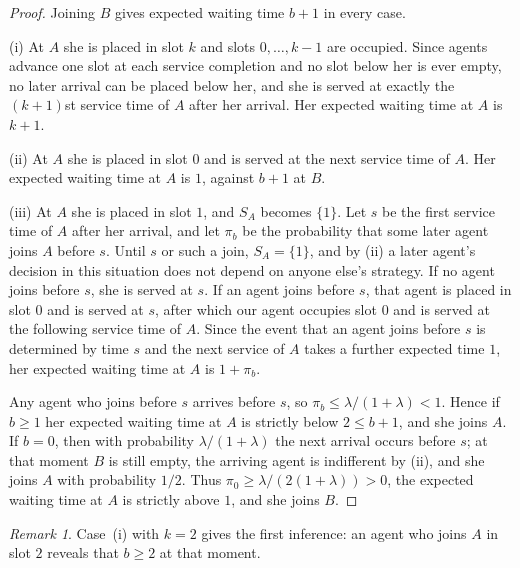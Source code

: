 \documentclass[11pt]{article}
\theoremstyle{definition}
\theoremstyle{remark}
\newtheorem{brem}[bthm]{Remark}
\begin{document}
\begin{proof}
Joining $B$ gives expected waiting time $b+1$ in every case.

(i) At $A$ she is placed in slot $k$ and slots $0,\dots,k-1$ are occupied.
Since agents advance one slot at each service completion and no slot below her
is ever empty, no later arrival can be placed below her, and she is served at
exactly the $(k+1)$st service time of $A$ after her arrival. Her expected
waiting time at $A$ is $k+1$.

(ii) At $A$ she is placed in slot $0$ and is served at the next service time of
$A$. Her expected waiting time at $A$ is $1$, against $b+1$ at $B$.

(iii) At $A$ she is placed in slot $1$, and $S_A$ becomes $\{1\}$. Let $s$ be
the first service time of $A$ after her arrival, and let $\pi_b$ be the
probability that some later agent joins $A$ before $s$. Until $s$ or such a
join, $S_A=\{1\}$, and by (ii) a later agent's decision in this situation does
not depend on anyone else's strategy. If no agent joins before $s$, she is
served at $s$. If an agent joins before $s$, that agent is placed in slot $0$
and is served at $s$, after which our agent occupies slot $0$ and is served at
the following service time of $A$. Since the event that an agent joins before
$s$ is determined by time $s$ and the next service of $A$ takes a further
expected time $1$, her expected waiting time at $A$ is $1+\pi_b$.

Any agent who joins before $s$ arrives before $s$, so
$\pi_b\le\lambda/(1+\lambda)<1$. Hence if $b\ge1$ her expected waiting time at
$A$ is strictly below $2\le b+1$, and she joins $A$. If $b=0$, then with
probability $\lambda/(1+\lambda)$ the next arrival occurs before $s$; at that
moment $B$ is still empty, the arriving agent is indifferent by (ii), and she
joins $A$ with probability $1/2$. Thus $\pi_0\ge\lambda/(2(1+\lambda))>0$, the
expected waiting time at $A$ is strictly above $1$, and she joins $B$.
\end{proof}

\begin{brem}
Case~(i) with $k=2$ gives the first inference: an agent who joins $A$ in slot
$2$ reveals that $b\ge 2$ at that moment.
\end{brem}
\end{document}
